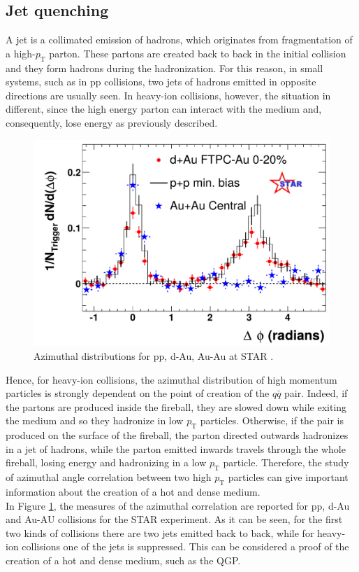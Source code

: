 \subsection{Jet quenching}
A jet is a collimated emission of hadrons, which originates from fragmentation of a high-$p_{\mathrm{T}}$ parton. These partons are created back to back in the initial collision and they form hadrons during the hadronization. For this reason, in small systems, such as in pp collisions, two jets of hadrons emitted in opposite directions are usually seen. In heavy-ion collisions, however, the situation in different, since the high energy parton can interact with the medium and, consequently, lose energy as previously described.
%
\begin{figure}
  \centering
  \includegraphics[scale=0.3]{figures/zoom.png}
  \caption{Azimuthal distributions for pp, d-Au, Au-Au at STAR \cite{jets}.}
  \label{fig:jet}
\end{figure}
%
Hence, for heavy-ion collisions, the azimuthal distribution of high momentum particles is strongly dependent on the point of creation of the $q\bar{q}$ pair. Indeed, if the partons are produced inside the fireball, they are slowed down while exiting the medium and so they hadronize in low $p_{\mathrm{T}}$ particles. Otherwise, if the pair is produced on the surface of the fireball, the parton directed outwards hadronizes in a jet of hadrons, while the parton emitted inwards travels through the whole fireball, losing energy and hadronizing in a low $p_{\mathrm{T}}$ particle. Therefore, the study of azimuthal angle correlation between two high $p_{\mathrm{T}}$ particles can give important information about the creation of a hot and dense medium.\\
In Figure \ref{fig:jet}, the measures of the azimuthal correlation are reported for pp, d-Au and Au-AU collisions for the STAR experiment. As it can be seen, for the first two kinds of collisions there are two jets emitted back to back, while for heavy-ion collisions one of the jets is suppressed. This can be considered a proof of the creation of a hot and dense medium, such as the QGP.
%

